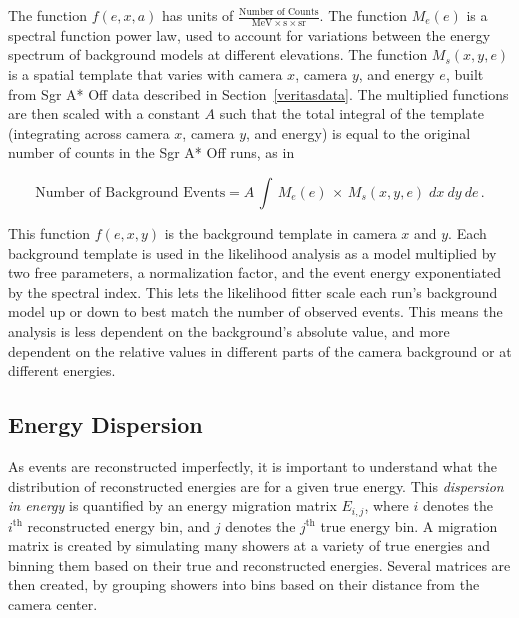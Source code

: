     The function $f(e,x,a)$ has units of $\frac{\textrm{Number of Counts}}{ \textrm{MeV} \times \textrm{s} \times \textrm{sr} }$.
    The function $M_{e}(e)$ is a spectral function power law, used to account for variations between the energy spectrum of background models at different elevations.
    The function $M_{s}(x,y,e)$ is a spatial template that varies with camera $x$, camera $y$, and energy $e$, built from Sgr A* Off data described in Section~\ref{veritasdata}.
    The multiplied functions are then scaled with a constant $A$ such that the total integral of the template (integrating across camera $x$, camera $y$, and energy) is equal to the original number of counts in the Sgr A* Off runs, as in
    
    \begin{equation}\label{eqn:background_template_function}
      \textrm{Number of Background Events} = A \, \int \, M_{e} \left ( e \right ) \, \times \, M_{s} \left ( x, y, e \right ) \; dx \: dy \: de \,.
    \end{equation}

    This function $f(e,x,y)$ is the background template in camera $x$ and $y$.
    Each background template is used in the likelihood analysis as a model multiplied by two free parameters, a normalization factor, and the event energy exponentiated by the spectral index.
    This lets the likelihood fitter scale each run's background model up or down to best match the number of observed events.
    This means the analysis is less dependent on the background's absolute value, and more dependent on the relative values in different parts of the camera background or at different energies.
  
  \FloatBarrier

  \subsection{Energy Dispersion}\label{subsec:edisp}
    As events are reconstructed imperfectly, it is important to understand what the distribution of reconstructed energies are for a given true energy.
    This \textit{dispersion in energy} is quantified by an energy migration matrix $E_{i,j}$, where $i$ denotes the $i^{\text{th}}$ reconstructed energy bin, and $j$ denotes the $j^{\text{th}}$ true energy bin.
    A migration matrix is created by simulating many showers at a variety of true energies and binning them based on their true and reconstructed energies.
    Several matrices are then created, by grouping showers into bins based on their distance from the camera center.
    
